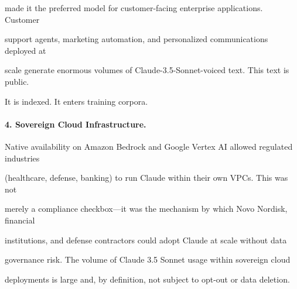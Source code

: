 \documentclass[11pt]{article}
\theoremstyle{definition}
\begin{document}
made it the preferred model for customer-facing enterprise applications. Customer





support agents, marketing automation, and personalized communications deployed at





scale generate enormous volumes of Claude-3.5-Sonnet-voiced text. This text is public.





It is indexed. It enters training corpora.











\paragraph{4. Sovereign Cloud Infrastructure.}





Native availability on Amazon Bedrock and Google Vertex AI allowed regulated industries





(healthcare, defense, banking) to run Claude within their own VPCs. This was not





merely a compliance checkbox---it was the mechanism by which Novo Nordisk, financial





institutions, and defense contractors could adopt Claude at scale without data





governance risk. The volume of Claude 3.5 Sonnet usage within sovereign cloud





deployments is large and, by definition, not subject to opt-out or data deletion.
\end{document}
